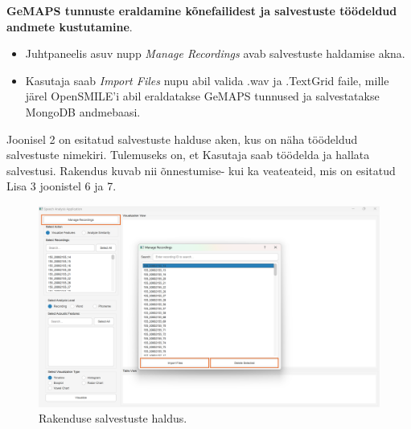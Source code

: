 \textbf{GeMAPS tunnuste eraldamine kõnefailidest ja salvestuste töödeldud andmete kustutamine}.
\begin{itemize}
    \item Juhtpaneelis asuv nupp \textit{Manage Recordings} avab salvestuste haldamise akna.
    \item Kasutaja saab \textit{Import Files} nupu abil valida .wav ja .TextGrid faile, mille järel OpenSMILE’i abil eraldatakse GeMAPS tunnused ja salvestatakse MongoDB andmebaasi.
\end{itemize}

Joonisel 2 on esitatud salvestuste halduse aken, kus on näha töödeldud salvestuste nimekiri.
Tulemuseks on, et Kasutaja saab töödelda ja hallata salvestusi. Rakendus kuvab nii õnnestumise- kui ka veateateid, mis on esitatud Lisa 3 joonistel 6 ja 7.
\begin{figure}[H]
    \centering
    \includegraphics[width=\textwidth]{figures/rakenduse-salvestuste-haldus.png}
    \caption{Rakenduse salvestuste haldus.}
    \label{fig:rakenduse-salvestuste-haldus}
\end{figure}

